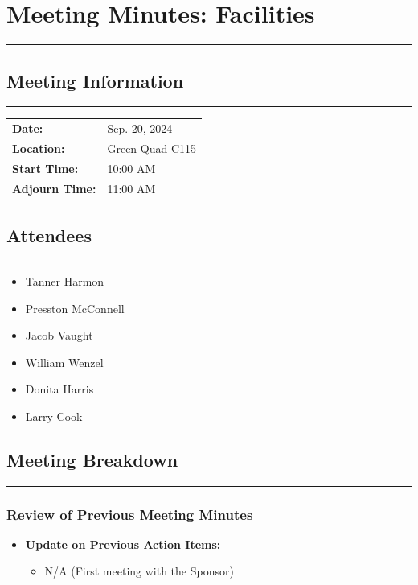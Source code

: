 \documentclass[12pt]{article}
\begin{document}
\section*{Meeting Minutes: Facilities}
\vspace{-1.3em}
\rule{\textwidth}{2pt}

\subsection*{Meeting Information}
\vspace{-1.3em}
\rule{\textwidth}{1pt}
\begin{tabular}{@{}ll@{}}
    \textbf{Date:} & Sep. 20, 2024 \\
    \textbf{Location:} & Green Quad C115 \\
    \textbf{Start Time:} & 10:00 AM \\
    \textbf{Adjourn Time:} & 11:00 AM \\
\end{tabular}

\subsection*{Attendees}
\vspace{-1.3em}
\rule{\textwidth}{1pt}
\begin{itemize}[noitemsep, topsep=0pt]
    \item Tanner Harmon
    \item Presston McConnell
    \item Jacob Vaught
    \item William Wenzel
    \item Donita Harris
    \item Larry Cook
\end{itemize}







\subsection*{Meeting Breakdown}
\vspace{-1.3em}
\rule{\textwidth}{1pt}
\vspace{-2.3em}
\subsubsection*{Review of Previous Meeting Minutes}
\begin{itemize}[noitemsep, topsep=0pt]
    \item \textbf{Update on Previous Action Items:}
    \begin{itemize}[noitemsep, topsep=0pt]
        \item N/A (First meeting with the Sponsor)
    \end{itemize}
\end{itemize}
\end{document}
